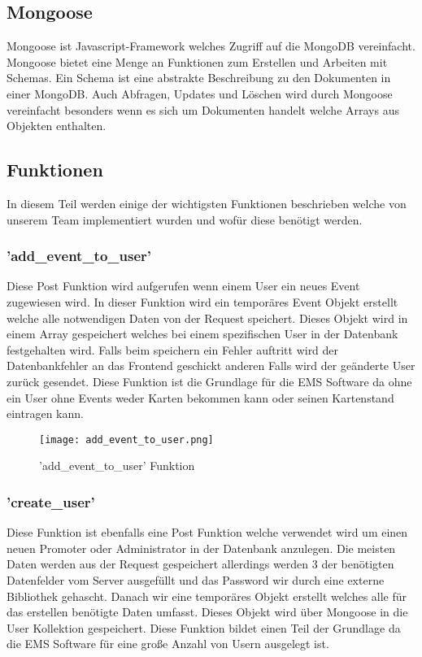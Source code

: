 		 	\subsection{Mongoose}
		 		Mongoose ist Javascript-Framework welches Zugriff auf die MongoDB vereinfacht. Mongoose bietet eine Menge an Funktionen zum Erstellen und Arbeiten mit Schemas. Ein Schema ist eine abstrakte Beschreibung zu den Dokumenten in einer MongoDB. Auch Abfragen, Updates und Löschen wird durch Mongoose vereinfacht besonders wenn es sich um Dokumenten handelt welche Arrays aus Objekten enthalten. 
		 	
			\subsection{Funktionen}
		 	In diesem Teil werden einige der wichtigsten Funktionen beschrieben welche von unserem Team implementiert wurden und wofür diese benötigt werden. 
		 	
		 	\subsubsection{'add\_event\_to\_user'}
		 		Diese Post Funktion wird aufgerufen wenn einem User ein neues Event zugewiesen wird. In dieser Funktion wird ein temporäres Event Objekt erstellt welche alle notwendigen Daten von der Request speichert. Dieses Objekt wird in einem Array gespeichert welches bei einem spezifischen User in der Datenbank festgehalten wird. Falls beim speichern ein Fehler auftritt wird der Datenbankfehler an das Frontend geschickt anderen Falls wird der geänderte User zurück gesendet. Diese Funktion ist die Grundlage für die EMS Software da ohne ein User ohne Events weder Karten bekommen kann oder seinen Kartenstand eintragen kann.
		 		
		 		\begin{figure}[H]
		 			\centering
		 			\texttt{[image: add\_event\_to\_user.png]}
		 			\caption{'add\_event\_to\_user' Funktion}
		 		\end{figure}
		 	
		 	\subsubsection{'create\_user'}
		 		Diese Funktion ist ebenfalls eine Post Funktion welche verwendet wird um einen neuen Promoter oder Administrator in der Datenbank anzulegen. Die meisten Daten werden aus der Request gespeichert allerdings werden 3 der benötigten Datenfelder vom Server ausgefüllt und das Password wir durch eine externe Bibliothek gehascht. Danach wir eine temporäres Objekt erstellt welches alle für das erstellen benötigte Daten umfasst. Dieses Objekt wird über Mongoose in die User Kollektion gespeichert. Diese Funktion bildet einen Teil der Grundlage da die EMS Software für eine große Anzahl von Usern ausgelegt ist. 
		 		

